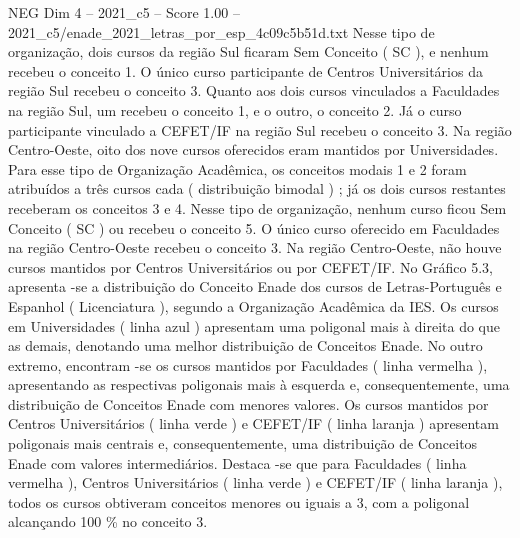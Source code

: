 \begin{textsample}{NEG Dim 4 – 2021\_c5 – Score 1.00 – 2021\_c5/enade\_2021\_letras\_por\_esp\_4c09c5b51d.txt}
Nesse tipo de organização, dois cursos da região Sul ficaram Sem Conceito ( SC ), e nenhum recebeu o conceito 1.
O único curso participante de Centros Universitários da região Sul recebeu o conceito 3.
Quanto aos dois cursos vinculados a Faculdades na região Sul, um recebeu o conceito 1, e o outro, o conceito 2.
Já o curso participante vinculado a CEFET/IF na região Sul recebeu o conceito 3.
Na região Centro-Oeste, oito dos nove cursos oferecidos eram mantidos por Universidades.
Para esse tipo de Organização Acadêmica, os conceitos modais 1 e 2 foram atribuídos a três cursos cada ( distribuição bimodal ) ; já os dois cursos restantes receberam os conceitos 3 e 4.
Nesse tipo de organização, nenhum curso ficou Sem Conceito ( SC ) ou recebeu o conceito 5.
O único curso oferecido em Faculdades na região Centro-Oeste recebeu o conceito 3.
Na região Centro-Oeste, não houve cursos mantidos por Centros Universitários ou por CEFET/IF.
No Gráfico 5.3, apresenta -se a distribuição do Conceito Enade dos cursos de Letras-Português e Espanhol ( Licenciatura ), segundo a Organização Acadêmica da IES.
Os cursos em Universidades ( linha azul ) apresentam uma poligonal mais à direita do que as demais, denotando uma melhor distribuição de Conceitos Enade.
No outro extremo, encontram -se os cursos mantidos por Faculdades ( linha vermelha ), apresentando as respectivas poligonais mais à esquerda e, consequentemente, uma distribuição de Conceitos Enade com menores valores.
Os cursos mantidos por Centros Universitários ( linha verde ) e CEFET/IF ( linha laranja ) apresentam poligonais mais centrais e, consequentemente, uma distribuição de Conceitos Enade com valores intermediários.
Destaca -se que para Faculdades ( linha vermelha ), Centros Universitários ( linha verde ) e CEFET/IF ( linha laranja ), todos os cursos obtiveram conceitos menores ou iguais a 3, com a poligonal alcançando 100 \% no conceito 3.

\end{textsample}
